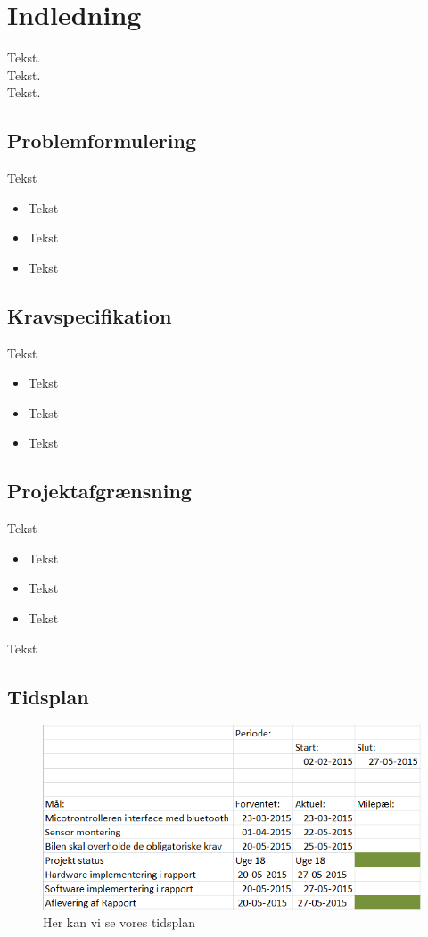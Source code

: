 \section{Indledning}

Tekst.\\

Tekst.\\

Tekst.\\




\subsection{Problemformulering}

Tekst
\begin{itemize}
	\item Tekst
	\item Tekst
	\item Tekst
\end{itemize}

\subsection{Kravspecifikation}

Tekst

\begin{itemize}
	\item Tekst
	\item Tekst
	\item Tekst

\end{itemize}


\subsection{Projektafgrænsning}

Tekst

\begin{itemize}
	\item Tekst
	\item Tekst
	\item Tekst
\end{itemize}

Tekst


\subsection{Tidsplan}

\begin{figure}[h]
	\centering
		\includegraphics[scale=0.75]{Billeder/Tidsplan.PNG}
	\caption{Her kan vi se vores tidsplan}
	\label{fig:tidsplan}
\end{figure}